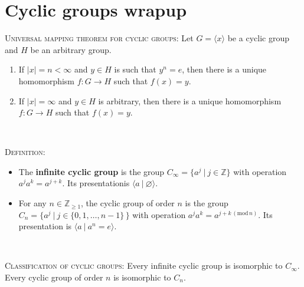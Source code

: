 \documentclass[12pt]{amsart}
\newcommand{\showsol}[1]{\def\displaysol{#1}}
\begin{document}
\showsol{0}
	
	\thispagestyle{empty}
	
	\section*{Cyclic groups wrapup}
	
	

\begin{framed}

\textsc{Universal mapping theorem for cyclic groups:} Let $G = \langle x \rangle$ be a cyclic group and $H$ be an arbitrary group.
\begin{enumerate}
\item If $|x|=n<\infty$ and $y\in H$ is such that $y^n=e$, then there is a unique homomorphism $f:G\to H$ such that $f(x)=y$.
\item If $|x|=\infty$ and $y\in H$ is arbitrary, then there is a unique homomorphism $f:G\to H$ such that $f(x)=y$.
\end{enumerate}

\

\textsc{Definition:} \begin{itemize}
\item The \textbf{infinite cyclic group}  is the group $C_\infty = \{ a^j \ | \ j\in \mathbb{Z}\}$ with operation $a^j a^k = a^{j+k}$. Its presentation\footnotemark is $\langle a \ | \ \varnothing \rangle$. 
\item For any $n\in \mathbb{Z}_{\geq 1}$, the cyclic group of order $n$ is the group $C_n=\{ a^j \ | \ j\in \{0,1,\dots,n-1\} \, \}$ with operation $a^j a^k = a^{j+k \, (\mathrm{mod} \, n)}$. Its presentation is $\langle a \ | \ a^n = e\rangle$.
\end{itemize}

\

\textsc{Classification of cyclic groups:} Every infinite cyclic group is isomorphic to $C_\infty$. Every cyclic group of order $n$ is isomorphic to $C_n$.
\end{framed}
\end{document}
